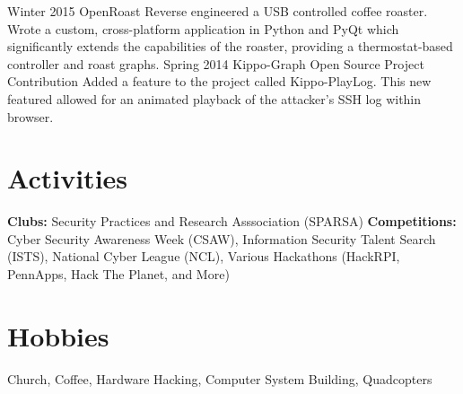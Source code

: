 \documentclass[]{CalebCoffie-CV-Class} %
\begin{document}
\begin{entrylist}
\entry
{Winter 2015}
{OpenRoast}
{}
{Reverse engineered a USB controlled coffee roaster. Wrote a custom, cross-platform application in Python and PyQt which significantly extends the capabilities of the roaster, providing a thermostat-based controller and roast graphs.}
\entry
{Spring 2014}
{Kippo-Graph}
{Open Source Project Contribution}
{Added a feature to the project called Kippo-PlayLog. This new featured allowed for an animated playback of the attacker’s SSH log within browser.}
\end{entrylist}

\section{Activities}

\textbf{Clubs:} Security Practices and Research Asssociation (SPARSA) \textbf{Competitions:} Cyber Security Awareness Week (CSAW), Information Security Talent Search (ISTS), National Cyber League (NCL), Various Hackathons (HackRPI, PennApps, Hack The Planet, and More)



\section{Hobbies}

Church, Coffee, Hardware Hacking, Computer System Building, Quadcopters
\end{document}
